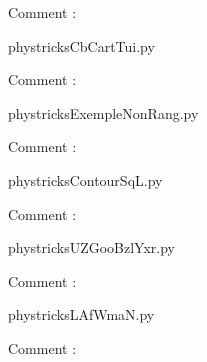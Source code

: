     Comment : 

    \clearpage
    


    \newcommand{\CaptionFigCbCartTui}{<+Type your caption here+>}
    \begin{center}
        
    \end{center}
    phystricksCbCartTui.py

    Comment : 

    \clearpage
    


    \newcommand{\CaptionFigExempleNonRang}{<+Type your caption here+>}
    \begin{center}
        
    \end{center}
    phystricksExempleNonRang.py

    Comment : 

    \clearpage
    


    \newcommand{\CaptionFigContourSqL}{<+Type your caption here+>}
    \begin{center}
        
    \end{center}
    phystricksContourSqL.py

    Comment : 

    \clearpage
    


    \newcommand{\CaptionFigUZGooBzlYxr}{<+Type your caption here+>}
    \begin{center}
        
    \end{center}
    phystricksUZGooBzlYxr.py

    Comment : 

    \clearpage
    


    \newcommand{\CaptionFigLAfWmaN}{<+Type your caption here+>}
    \begin{center}
        
    \end{center}
    phystricksLAfWmaN.py

    Comment : 

    \clearpage
    

